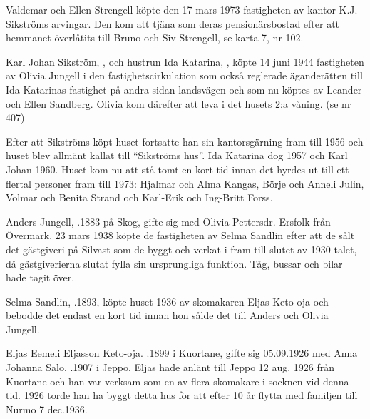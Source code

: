 {{{{%
%
Valdemar och Ellen Strengell köpte den 17 mars 1973 fastigheten av kantor K.J. Sikströms arvingar. Den kom att tjäna som deras pensionärsbostad efter att hemmanet överlåtits till Bruno och Siv Strengell, se karta 7, nr 102.



%
Karl Johan Sikström, , och hustrun Ida Katarina, , köpte 14 juni 1944 fastigheten av Olivia Jungell i den fastighetscirkulation som också reglerade äganderätten till Ida Katarinas fastighet på andra sidan landsvägen och som nu köptes av Leander och Ellen Sandberg. Olivia kom därefter att leva i det husets 2:a våning. (se nr 407)

Efter att Sikströms köpt huset fortsatte han sin kantorsgärning fram till 1956 och huset blev allmänt kallat till ``Sikströms hus''. Ida Katarina dog 1957 och Karl Johan 1960. Huset kom nu att stå tomt en kort tid innan det hyrdes ut till ett flertal personer fram till 1973: Hjalmar och Alma Kangas, Börje och Anneli Julin, Volmar och Benita Strand och Karl-Erik och Ing-Britt Forss.


%
Anders Jungell, .1883 på Skog, gifte sig med Olivia Pettersdr. Ersfolk från Övermark. 23 mars 1938 köpte de fastigheten av Selma Sandlin efter att de sålt det gästgiveri på Silvast som de byggt och verkat i fram till slutet av 1930-talet, då gästgiverierna slutat fylla sin ursprungliga funktion. Tåg, bussar och bilar hade tagit över.


%
Selma Sandlin, .1893, köpte huset 1936 av skomakaren Eljas Keto-oja och bebodde det endast en kort tid innan hon sålde det till Anders och Olivia Jungell.


%
Eljas Eemeli Eljasson Keto-oja. .1899 i Kuortane, gifte sig 05.09.1926 med Anna Johanna Salo, .1907 i Jeppo. Eljas hade anlänt till Jeppo 12 aug. 1926 från Kuortane och han var verksam som en av flera skomakare i socknen vid denna tid. 1926 torde han ha byggt detta hus för att efter 10 år flytta med familjen till Nurmo 7 dec.1936.
\begin{jhchildren}
  \item {}
  \item {}
\end{jhchildren}



}}}}
